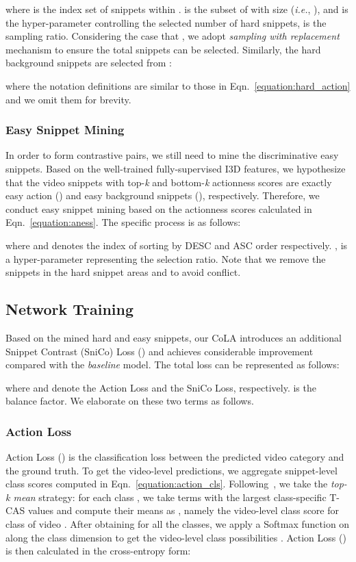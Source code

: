 \documentclass[final]{cvpr}
\begin{document}
\noindent where  is the index set of snippets within .  is the subset of  with size 
(\emph{i.e.}, ), and  is the hyper-parameter controlling the selected number of hard snippets,  is the sampling ratio. Considering the case that , we adopt \emph{sampling with replacement} mechanism to ensure the total  snippets can be selected. Similarly, the hard background snippets  are selected from :

\noindent where the notation definitions are similar to those in Eqn.~\ref{equation:hard_action} and we omit them for brevity. 

\subsubsection{Easy Snippet Mining} In order to form contrastive pairs, we still need to mine the discriminative easy snippets. Based on the well-trained fully-supervised I3D features, we hypothesize that the video snippets with top-\textit{k} and bottom-\textit{k} actionness scores are exactly easy action () and easy background snippets (), respectively. Therefore, we conduct easy snippet mining based on the actionness scores calculated in Eqn.~\ref{equation:aness}. The specific process is as follows:
\begin{comment}

\end{comment}

\noindent where  and  denotes the index of  sorting by DESC and ASC order respectively. ,  is a hyper-parameter representing the selection ratio. Note that we remove the snippets in the hard snippet areas  and  to avoid conflict.

\subsection{Network Training} \label{subsec:loss}
Based on the mined hard and easy snippets, our CoLA introduces an additional Snippet Contrast (SniCo) Loss () and achieves considerable improvement compared with the \textit{baseline} model. The total loss can be represented as follows:

where  and  denote the Action Loss and the SniCo Loss, respectively.  is the balance factor. We elaborate on these two terms as follows.

\subsubsection{Action Loss} \label{method:act_loss}
Action Loss () is the classification loss between the predicted video category and the ground truth. To get the video-level predictions, we aggregate snippet-level class scores computed in Eqn.~\ref{equation:action_cls}. Following~\cite{wang2017untrimmednets,paul2018w,lee2020background}, we take the \textit{top-k mean} strategy: for each class , we take  terms with the largest class-specific T-CAS values and compute their means as , namely the video-level class score for class  of video . After obtaining  for all the  classes, we apply a Softmax function on  along the class dimension to get the video-level class possibilities . Action Loss () is then calculated in the cross-entropy form: 
\end{document}
